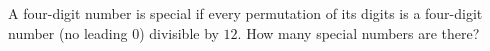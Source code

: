 A four-digit number is special if every permutation of its digits is a four-digit number (no leading $0$) divisible by $12$. How many special numbers are there?
